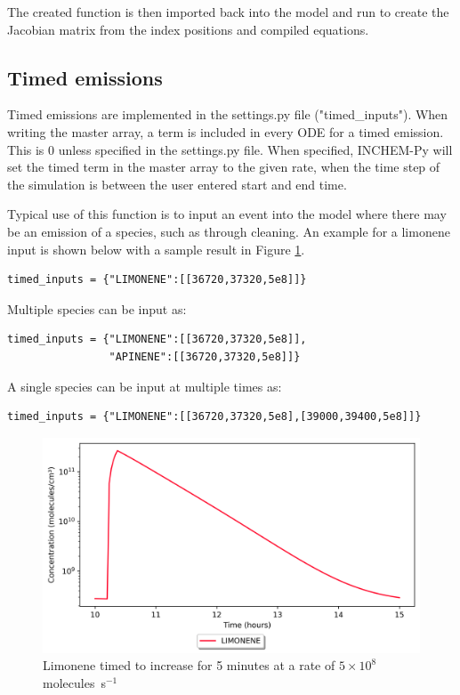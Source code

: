 \documentclass[a4paper]{refart}
\begin{document}
The created function is then imported back into the model and run to create the Jacobian matrix from the index positions and compiled equations.

\subsection{Timed emissions}\label{timed emissions, implementation}
Timed emissions are implemented in the settings.py file ("timed\_inputs").  When writing the master array, a term is included in every ODE for a timed emission. This is 0 unless specified in the settings.py file. When specified, INCHEM-Py will set the timed term in the master array to the given rate, when the time step of the simulation is between the user entered start and end time. 

Typical use of this function is to input an event into the model where there may be an emission of a species, such as through cleaning. An example for a limonene input is shown below with a sample result in Figure \ref{fig:timed_limonene}. 

\begin{verbatim}
timed_inputs = {"LIMONENE":[[36720,37320,5e8]]}    
\end{verbatim}

Multiple species can be input as:
\begin{verbatim}
timed_inputs = {"LIMONENE":[[36720,37320,5e8]],
                "APINENE":[[36720,37320,5e8]]}
\end{verbatim}

A single species can be input at multiple times as:
\begin{verbatim}
timed_inputs = {"LIMONENE":[[36720,37320,5e8],[39000,39400,5e8]]} 
\end{verbatim}

\clearpage
\begin{figure}[h!]
    \centering
    \includegraphics[width=\textwidth]{timed_limonene.png}
    \caption{Limonene timed to increase for 5 minutes at a rate of $5\times10^8$ molecules~s$^{-1}$}
    \label{fig:timed_limonene}
\end{figure}
\end{document}
